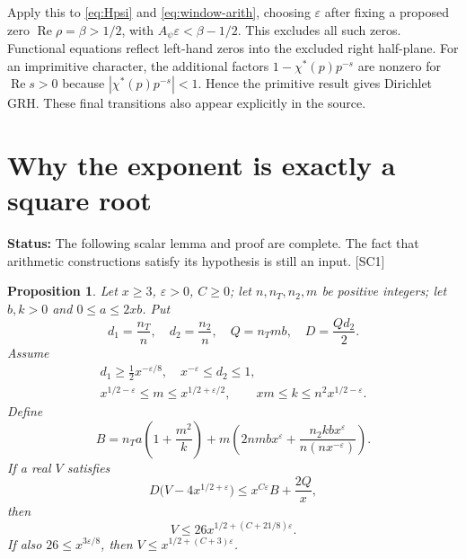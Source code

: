 \documentclass[11pt,a4paper]{article}
\numberwithin{equation}{section}
\newtheorem{proposition}[theorem]{Proposition}
\theoremstyle{remark}\newtheorem{remark}[theorem]{Remark}
\newcommand{\Rea}{\operatorname{Re}}
\newcommand{\status}[1]{\textbf{Status:} #1}
\begin{document}
Apply this to \eqref{eq:Hpsi} and \eqref{eq:window-arith}, choosing $\varepsilon$ after fixing a proposed zero $\Rea\rho=\beta>1/2$, with $A_\psi\varepsilon<\beta-1/2$. This excludes all such zeros. Functional equations reflect left-hand zeros into the excluded right half-plane. For an imprimitive character, the additional factors $1-\chi^*(p)p^{-s}$ are nonzero for $\Rea s>0$ because $|\chi^*(p)p^{-s}|<1$. Hence the primitive result gives Dirichlet GRH. These final transitions also appear explicitly in the source.\cite{critline}

\section{Why the exponent is exactly a square root}\label{sec:scalar}

\status{The following scalar lemma and proof are complete. The fact that arithmetic constructions satisfy its hypothesis is still an input. \textsf{[SC1]}}

\begin{proposition}\label{prop:scalar}
Let $x\ge3$, $\varepsilon>0$, $C\ge0$; let $n,n_T,n_2,m$ be positive integers; let $b,k>0$ and $0\le a\le2xb$. Put
\[
d_1=\frac{n_T}{n},\quad d_2=\frac{n_2}{n},\quad Q=n_Tmb,
\quad D=\frac{Qd_2}{2}.
\]
Assume
\begin{gather}\label{eq:scales}
d_1\ge\tfrac12x^{-\varepsilon/8},\quad x^{-\varepsilon}\le d_2\le1,\\
x^{1/2-\varepsilon}\le m\le x^{1/2+\varepsilon/2},\qquad
xm\le k\le n^2x^{1/2-\varepsilon}.
\end{gather}
Define
\begin{equation}\label{eq:B}
B=n_Ta\left(1+\frac{m^2}{k}\right)
+m\left(2nmbx^\varepsilon+
\frac{n_2kbx^\varepsilon}{n(nx^{-\varepsilon})}\right).
\end{equation}
If a real $V$ satisfies
\begin{equation}\label{eq:scalarhyp}
D\bigl(V-4x^{1/2+\varepsilon}\bigr)
       \le x^{C\varepsilon}B+\frac{2Q}{x},
\end{equation}
then
\begin{equation}\label{eq:scalarcon}
V\le26x^{1/2+(C+21/8)\varepsilon}.
\end{equation}
If also $26\le x^{3\varepsilon/8}$, then $V\le x^{1/2+(C+3)\varepsilon}$.
\end{proposition}
\end{document}
